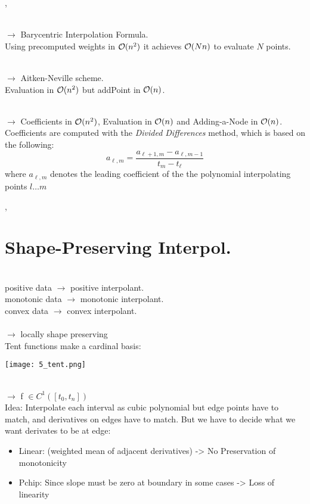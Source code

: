 \sep

 \\
$\rightarrow$ Barycentric Interpolation Formula. \\
Using precomputed weights in $\mathcal{O}(n^2)$ it achieves $\mathcal{O}(N n)$ to evaluate $N$ points.

 \\
$\rightarrow$ Aitken-Neville scheme. \\
Evaluation in $\mathcal{O}(n^2)$ but addPoint in $\mathcal{O}(n)$.

 \\
$\rightarrow$ Coefficients in $\mathcal{O}(n^2)$, Evaluation in $\mathcal{O}(n)$ and Adding-a-Node in $\mathcal{O}(n)$. \\
Coefficients are computed with the \textit{Divided Differences} method, which is based on the following:
$$
a_{\ell, m}=\frac{a_{\ell+1, m}-a_{\ell, m-1}}{t_{m}-t_{\ell}}
$$
where $a_{\ell, m}$ denotes the leading coefficient of the the polynomial interpolating points $l \dots m$

\sep
\Method[Extrapolation] \\

\section{Shape-Preserving Interpol.}

 \\
positive data $\longrightarrow$ positive interpolant. \\
monotonic data $\longrightarrow$ monotonic interpolant.\\
convex data $\longrightarrow$ convex interpolant. \\

 \\
$\rightarrow$ locally shape preserving \\
Tent functions make a cardinal basis:
\begin{center}
\texttt{[image: 5\_tent.png]}
\end{center}

 \\
$\rightarrow$ f $\in C^{1}\left(\left[t_{0}, t_{n}\right]\right)$ \\
Idea: Interpolate each interval as cubic polynomial but edge points have to match, and derivatives on edges have to match. But we have to decide what we want derivates to be at edge:
\begin{itemize}
	\item Linear: (weighted mean of adjacent derivatives) -> No Preservation of monotonicity
	\item Pchip: Since slope must be zero at boundary in some cases -> Loss of linearity
\end{itemize}


